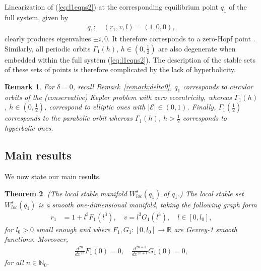 \documentclass[reqno,12pt]{amsart}
\newcommand{\eqlab}[1]{\label{eq:#1}}
\renewcommand{\eqref}[1]{(\ref{eq:#1})}
\newcommand{\remref}[1]{Remark~\ref{remark:#1}}
\newcommand{\thmlab}[1]{\label{theorem:#1}}
\newtheorem{theorem}{Theorem}[section]
\newtheorem{remark}[theorem]{Remark}
\numberwithin{equation}{section}
\begin{document}
 

Linearization of \eqref{l1eqns2} at the corresponding equilibrium point $q_1$ of the full system, given by
\begin{align*}
 q_1:\quad (r_1,v,l)=(1,0,0),
\end{align*}
clearly produces eigenvalues $\pm i,0$. It therefore corresponds to a zero-Hopf point \cite{Guckenheimer97}. Similarly, all periodic orbits $\Gamma_1(h)$, $h\in \left(0,\frac12\right)$ are also degenerate when embedded within the full system \eqref{l1eqns2}. The description of the stable sets of these sets of points is therefore complicated by the lack of hyperbolicity. 

\begin{remark}
For $\delta=0$, recall \remref{delta0}, $q_1$ corresponds to circular orbits of the (conservative) Kepler problem with zero eccentricity, whereas $\Gamma_1(h)$, $h\in (0,\frac12)$, correspond to elliptic ones with $\vert \mathcal E\vert \in (0,1)$. Finally, $\Gamma_1\!\left(\frac12\right)$ corresponds to the parabolic orbit whereas $\Gamma_1(h)$, $h>\frac12$ corresponds to hyperbolic ones. 
\end{remark}
\subsection{Main results}
We now state our main results.
\begin{theorem}\thmlab{main1}
\textnormal{(The local stable manifold $W_{loc}^s(q_1)$ of $q_1$.)} The local stable set $W_{loc}^s(q_1)$ is a smooth one-dimensional manifold, taking the following graph form
\begin{align}
r_1 &=1+l^3 F_1(l^3),\quad v=
l^3 G_1(l^3),\quad l\in [0,l_0],\eqlab{manifold1}
\end{align}
for $l_0>0$ small enough and 
where $F_1,G_1:[0,l_0]\rightarrow \mathbb R$ are Gevrey-1 smooth functions. Moreover,
\begin{align}
 \frac{d^{2n}}{dx^{2n}} F_1(0) = 0,\quad \frac{d^{2n+1}}{dx^{2n+1}} G_1(0)=0,\eqlab{FevenGodd}
\end{align}
for all $n\in \mathbb N_0$.


\end{theorem}
\end{document}
